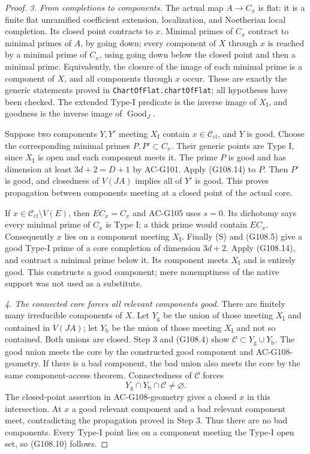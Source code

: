 \begin{proof}
\emph{3. From completions to components.}
The actual map $A\to C_x$ is flat: it is a finite flat unramified
coefficient extension, localization, and Noetherian local
completion.  Its closed point contracts to $x$.  Minimal primes
of $C_x$ contract to minimal primes of $A$, by going down;
every component of $X$ through $x$ is reached by a minimal prime
of $C_x$, using going down below the closed point and then a
minimal prime.  Equivalently, the closure of the image of each
minimal prime is a component of $X$, and all components through
$x$ occur.  These are exactly the generic statements proved in
\texttt{ChartOfFlat.chartOfFlat}; all hypotheses have been checked.
The extended Type-I predicate is the inverse image of
$X_{\mathrm I}$, and goodness is the inverse image of
$\operatorname{Good}_J$.

Suppose two components $Y,Y'$ meeting $X_{\mathrm I}$ contain
$x\in\mathcal C_{\mathrm{cl}}$, and $Y$ is good.  Choose the
corresponding minimal primes $P,P'\subset C_x$.  Their generic
points are Type I, since $X_{\mathrm I}$ is open and each
component meets it.  The prime $P$ is good and has dimension
at least $3d+2=D+1$ by AC-G101.  Apply (G108.14) to $P$.
Then $P'$ is good, and closedness of $V(JA)$ implies all of $Y'$
is good.  This proves propagation between components meeting
at a closed point of the actual core.

If $x\in\mathcal C_{\mathrm{cl}}\setminus V(E)$, then $EC_x=C_x$
and AC-G105 uses $s=0$.  Its dichotomy says every minimal prime
of $C_x$ is Type I; a thick prime would contain $EC_x$.
Consequently $x$ lies on a component meeting $X_{\mathrm I}$.
Finally (S) and (G108.5) give a good Type-I prime of a core
completion of dimension $3d+2$.  Apply (G108.14), and contract
a minimal prime below it.  Its component meets $X_{\mathrm I}$
and is entirely good.  This constructs a good component; mere
nonemptiness of the native support was not used as a substitute.

\emph{4. The connected core forces all relevant components good.}
There are finitely many irreducible components of $X$.  Let
$Y_{\mathrm g}$ be the union of those meeting $X_{\mathrm I}$
and contained in $V(JA)$; let $Y_{\mathrm b}$ be the union of
those meeting $X_{\mathrm I}$ and not so contained.  Both unions
are closed.  Step 3 and (G108.4) show
$\mathcal C\subset Y_{\mathrm g}\cup Y_{\mathrm b}$.
The good union meets the core by the constructed good component
and AC-G108-geometry.  If there is a bad component, the bad union
also meets the core by the same component-access theorem.
Connectedness of $\mathcal C$ forces
\[
 Y_{\mathrm g}\cap Y_{\mathrm b}\cap\mathcal C\ne\varnothing.
 \tag{G108.15}
\]
The closed-point assertion in AC-G108-geometry gives a closed
$x$ in this intersection.  At $x$ a good relevant component
and a bad relevant component meet, contradicting the propagation
proved in Step 3.  Thus there are no bad components.
Every Type-I point lies on a component meeting the Type-I open
set, so (G108.10) follows.


\end{proof}
